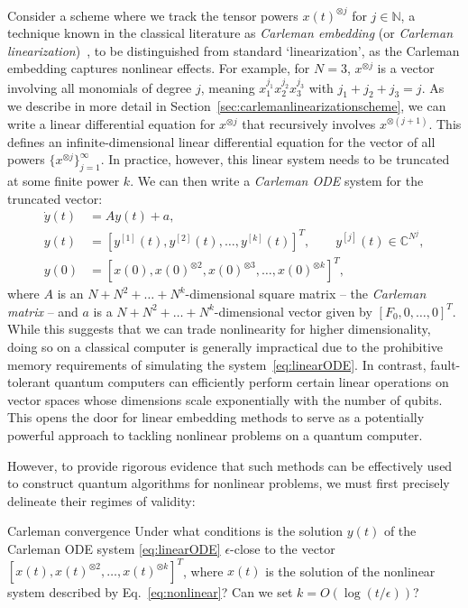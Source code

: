 \documentclass[superscriptaddress,onecolumn,nofootinbib,longbibliography,a4paper,accepted=2026-09-29]{quantumarticle}
\theoremstyle{plain}
\theoremstyle{definition}
\numberwithin{thm}{section}
\numberwithin{assumption}{section}
\numberwithin{lemma}{section}
\numberwithin{prop}{section}
\numberwithin{cor}{section}
\numberwithin{definition}{section}
\numberwithin{rmk}{section}
\numberwithin{equation}{section}
\newcommand{\ot}{\otimes}
\newcommand{\lrb}[1]{\left ( #1 \right )}
\newcommand{\mylog}[1]{\operatorname{log} \lrb{#1}}
\newcommand{\myO}[1]{O\lrb{#1}}
\begin{document}
Consider a scheme where we track the tensor powers $x(t)^{\otimes j}$ for $j \in \mathbb{N}$, a technique known in the classical literature as \emph{Carleman embedding} (or \emph{Carleman linearization})~\cite{Carleman32, kowalski1991nonlinear}, to be distinguished from standard `linearization', as the Carleman embedding captures nonlinear effects. For example, for $N=3$, $x^{\otimes j}$ is a vector involving all monomials of degree $j$, meaning $x^{j_1}_1 x^{j_2}_2 x^{j_3}_3$ with $j_1 + j_2 + j_3 = j$.  As we describe in more detail in Section~\ref{sec:carlemanlinearizationscheme}, we can write a linear differential equation for $x^{\ot j}$ that recursively involves $x^{\ot (j+1)}$. This defines an infinite-dimensional linear differential equation for the vector of all powers $\{ x^{\ot j} \}_{j=1}^{\infty}$. In practice, however, this linear system needs to be truncated at some finite power $k$. We can then write a \emph{Carleman ODE} system for the truncated vector:
\begin{equation}
\begin{aligned}
\label{eq:linearODE}
    \dot{y}(t)& = Ay(t) + a,  \\
     y(t) &=  [y^{[1]}(t), y^{[2]}(t), \dots, y^{[k]}(t)]^T, \quad  \quad y^{[j]}(t) \in \mathbb{C}^{N^j},  \\
    y(0) &= [ x(0),x(0)^{\otimes 2},x(0)^{\otimes 3}, \dots, x(0)^{\otimes k} ]^T,
\end{aligned}
\end{equation}
where $A$ is an $N+N^2 + \dots + N^{k}$-dimensional square matrix -- the \emph{Carleman matrix} -- and $a$ is a $N+N^2 + \dots + N^{k}$-dimensional vector given by $[F_0,0,\dots,0]^T$. While this suggests that we can trade nonlinearity for higher dimensionality, doing so on a classical computer is generally impractical due to the prohibitive memory requirements of simulating the system~\eqref{eq:linearODE}. In contrast, fault-tolerant quantum computers can efficiently perform certain linear operations on vector spaces whose dimensions scale exponentially with the number of qubits. This opens the door for linear embedding methods to serve as a potentially powerful approach to tackling nonlinear problems on a quantum computer.

However, to provide rigorous evidence that such methods can be effectively used to construct quantum algorithms for nonlinear problems, we must first precisely delineate their regimes of validity:

\begin{questionbox}{Carleman convergence}{}
    \label{question1}
    Under what conditions is the solution $y(t)$ of the Carleman ODE system \eqref{eq:linearODE} $\epsilon$-close to the vector $[x(t), x(t)^{\otimes 2}, \dots, x(t)^{\otimes k}]^T$, where $x(t)$ is the solution of the nonlinear system described by Eq.~\eqref{eq:nonlinear}? Can we set $k = \myO{\mylog{t/\epsilon}}$?  
\end{questionbox}
\end{document}

